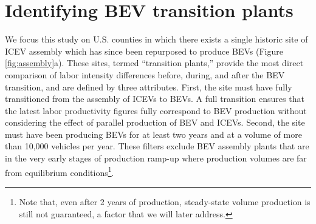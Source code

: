 \documentclass[sn-mathphys,Numbered]{sn-jnl}%
\begin{document}

\section{Identifying BEV transition plants}

We focus this study on U.S. counties in which there exists a single historic site of ICEV assembly which has since been repurposed to produce BEVs (Figure \ref{fig:assembly}a). These sites, termed ``transition plants,'' provide the most direct comparison of labor intensity differences before, during, and after the BEV transition, and are defined by three attributes. First, the site must have fully transitioned from the assembly of ICEVs to BEVs. A full transition ensures that the latest labor productivity figures fully correspond to BEV production without considering the effect of parallel production of BEV and ICEVs. Second, the site must have been producing BEVs for at least two years and at a volume of more than 10,000 vehicles per year. These filters exclude BEV assembly plants that are in the very early stages of production ramp-up where production volumes are far from equilibrium conditions\footnote{Note that, even after 2 years of production, steady-state volume production is still not guaranteed, a factor that we will later address.}. 
\end{document}
